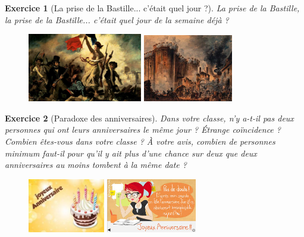 \documentclass[12pt]{article}
\theoremstyle{break}
\newtheorem{exo}{Exercice}
\begin{document}
\begin{exo}[La prise de la Bastille... c'était quel jour ?]
La prise de la Bastille, la prise de la Bastille... c'était quel jour de la semaine déjà ?

\begin{figure}[h!]
	\centering
	\includegraphics[width=0.445\textwidth]{images/MarianneGuidantLePeuple.jpg}
    \includegraphics[width=0.35\textwidth]{images/PriseDeLaBastille.jpg}
\end{figure}
\end{exo}


\begin{exo}[Paradoxe des anniversaires]
Dans votre classe, n'y a-t-il pas deux personnes qui ont leurs anniversaires le même jour ? Étrange coïncidence ? Combien êtes-vous dans votre classe ? À votre avis, combien de personnes minimum faut-il pour qu'il y ait plus d'une chance sur deux que deux anniversaires au moins tombent à la même date ?

\begin{figure}[h!]
	\centering
	\includegraphics[width=0.3\textwidth]{images/AnniversaireGateau.jpg}
    \includegraphics[width=0.35\textwidth]{images/ReflexionAnniversaire.jpg}
\end{figure}
\end{exo}
\end{document}
